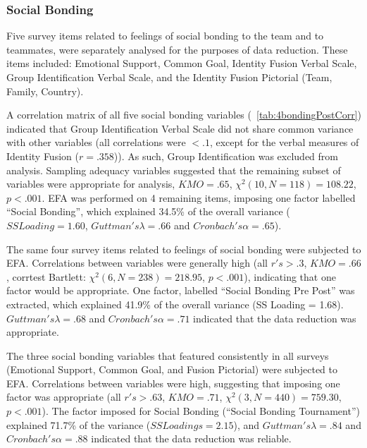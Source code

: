\begin{CJK}{UTF8}{gbsn}


\subsubsection{Social Bonding}
Five survey items related to feelings of social bonding to the team and to teammates, were separately analysed for the purposes of data reduction.  These items included: Emotional Support, Common Goal, Identity Fusion Verbal Scale, Group Identification Verbal Scale, and the Identity Fusion Pictorial (Team, Family, Country).

A correlation matrix of all five social bonding variables (~\ref{tab:4bondingPostCorr}) indicated that Group Identification Verbal Scale did not share common variance with other variables (all correlations were $<.1$, except for the verbal measures of Identity Fusion ($r =.358$)). As such, Group Identification was excluded from analysis.  Sampling adequacy variables suggested that the remaining subset of variables were appropriate for analysis, $KMO = .65$, $\chi^2(10, N = 118) = 108.22$, $p < .001$.  EFA was performed on 4 remaining items, imposing one factor labelled ``Social Bonding'', which explained 34.5\% of the overall variance ($SS Loading = 1.60$, $Guttman's \lambda =.66$ and $Cronbach's \alpha = .65$).

The same four survey items related to feelings of social bonding were subjected to EFA. Correlations between variables were generally high (all $r's > .3$, $KMO = .66$, corrtest Bartlett: $\chi^2(6, N = 238) = 218.95$, $p < .001$), indicating that one factor would be appropriate.  One factor, labelled ``Social Bonding Pre Post'' was extracted, which explained 41.9\% of the overall variance (SS Loading = 1.68).  $Guttman's \lambda =.68$ and $Cronbach's \alpha = .71$ indicated that the data reduction was appropriate.

The three social bonding variables that featured consistently in all surveys (Emotional Support, Common Goal, and Fusion Pictorial) were subjected to EFA. Correlations between variables were high, suggesting that imposing one factor was appropriate (all $r's > .63$, $KMO = .71$, $\chi^2(3, N = 440) =  759.30$, $p < .001$).  The factor imposed for Social Bonding (``Social Bonding Tournament'') explained 71.7\% of the variance ($SS Loadings =  2.15$), and $Guttman's \lambda =.84$ and $Cronbach's \alpha= .88$ indicated that the data reduction was reliable.


\end{CJK}
